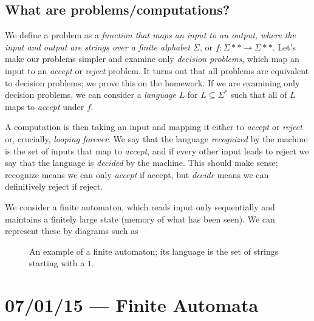 \documentclass[10pt]{report}
\begin{document}
\section{What are problems/computations?}

We define a problem as a \emph{function that maps an input to an output, where the input and output are strings over a finite alphabet $\Sigma$}, or $f: \Sigma** \to \Sigma**$. Let's make our problems simpler and examine only \emph{decision problems}, which map an input to an \emph{accept} or \emph{reject} problem. It turns out that all problems are equivalent to decision problems; we prove this on the homework. If we are examining only decision problems, we can consider a \emph{language} $L$ for $L \subseteq \Sigma^*$ such that all of $L$ maps to \emph{accept} under $f$. 

A computation is then taking an input and mapping it either to \emph{accept} or \emph{reject} or, crucially, \emph{looping forever}. We say that the language \emph{recognized} by the machine is the set of inputs that map to \emph{accept}, and if every other input leads to reject we say that the language is \emph{decided} by the machine. This should make sense; recognize means we can only \emph{accept} if accept, but \emph{decide} means we can definitively reject if reject.

We consider a finite automaton, which reads input only sequentially and maintains a finitely large state (memory of what has been seen). We can represent these by diagrams such as
\begin{figure}[!h]
    \centering
    \caption{An example of a finite automaton; its language is the set of strings starting with a $1$.}
\end{figure}

\chapter{07/01/15 --- Finite Automata}
\end{document}
